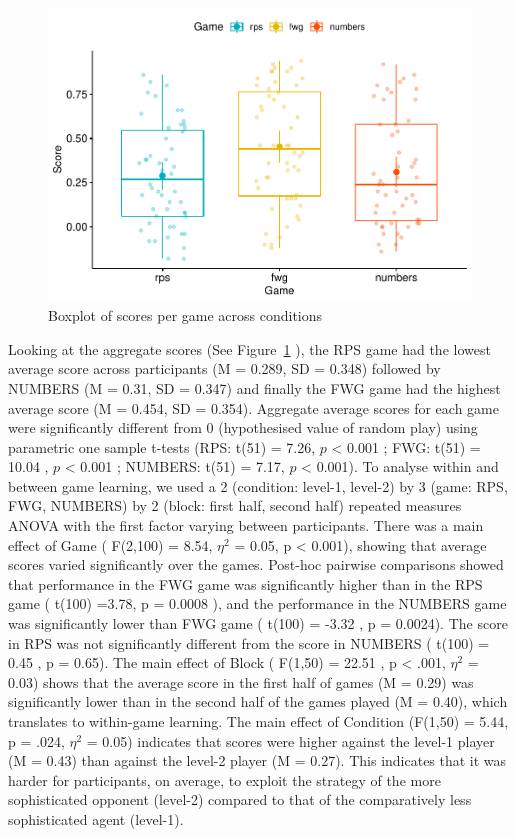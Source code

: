 \documentclass[man,floatsintext]{apa6}
\begin{document}
\begin{figure}

{\centering \includegraphics{draft_report_v3_files/figure-latex/exp1-avg-scores-game-1} 

}

\caption{Boxplot of scores per game across conditions}\label{fig:exp1-avg-scores-game}
\end{figure}

Looking at the aggregate scores (See Figure~\ref{fig:exp1-avg-scores-game} ), the RPS game had the lowest average score across participants (M = 0.289, SD = 0.348) followed by NUMBERS (M = 0.31, SD = 0.347) and finally the FWG game had the highest average score (M = 0.454, SD = 0.354). Aggregate average scores for each game were significantly different from 0 (hypothesised value of random play) using parametric one sample t-tests (RPS: t(51) = 7.26, \(p\) \textless{} 0.001 ; FWG: t(51) = 10.04 , \(p\) \textless{} 0.001 ; NUMBERS: t(51) = 7.17, \(p\) \textless{} 0.001).
To analyse within and between game learning, we used a 2 (condition: level-1, level-2) by 3 (game: RPS, FWG, NUMBERS) by 2 (block: first half, second half) repeated measures ANOVA with the first factor varying between participants. There was a main effect of Game ( F(2,100) = 8.54, \(\eta^{2}\) = 0.05, p \textless{} 0.001), showing that average scores varied significantly over the games. Post-hoc pairwise comparisons showed that performance in the FWG game was significantly higher than in the RPS game ( t(100) =3.78, p = 0.0008 ), and the performance in the NUMBERS game was significantly lower than FWG game ( t(100) = -3.32 , p = 0.0024). The score in RPS was not significantly different from the score in NUMBERS ( t(100) = 0.45 , p = 0.65). The main effect of Block ( F(1,50) = 22.51 , p \textless{} .001, \(\eta^{2}\) = 0.03) shows that the average score in the first half of games (M = 0.29) was significantly lower than in the second half of the games played (M = 0.40), which translates to within-game learning. The main effect of Condition (F(1,50) = 5.44, p = .024, \(\eta^{2}\) = 0.05) indicates that scores were higher against the level-1 player (M = 0.43) than against the level-2 player (M = 0.27). This indicates that it was harder for participants, on average, to exploit the strategy of the more sophisticated opponent (level-2) compared to that of the comparatively less sophisticated agent (level-1).
\end{document}

